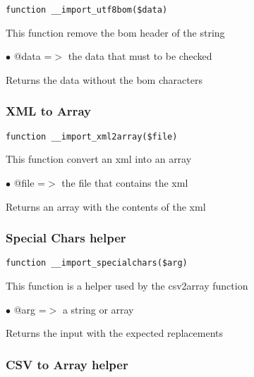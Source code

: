 \documentclass[a4paper]{article}
\begin{document}
\begin{lstlisting}
function __import_utf8bom($data)
\end{lstlisting}

This function remove the bom header of the string

\begin{compactitem}
\item[\color{myblue}$\bullet$] @data =$>$ the data that must to be checked
\end{compactitem}

Returns the data without the bom characters

\hypertarget{toc465}{}
\subsubsection{XML to Array}

\begin{lstlisting}
function __import_xml2array($file)
\end{lstlisting}

This function convert an xml into an array

\begin{compactitem}
\item[\color{myblue}$\bullet$] @file =$>$ the file that contains the xml
\end{compactitem}

Returns an array with the contents of the xml

\hypertarget{toc466}{}
\subsubsection{Special Chars helper}

\begin{lstlisting}
function __import_specialchars($arg)
\end{lstlisting}

This function is a helper used by the csv2array function

\begin{compactitem}
\item[\color{myblue}$\bullet$] @arg =$>$ a string or array
\end{compactitem}

Returns the input with the expected replacements

\hypertarget{toc467}{}
\subsubsection{CSV to Array helper}
\end{document}
